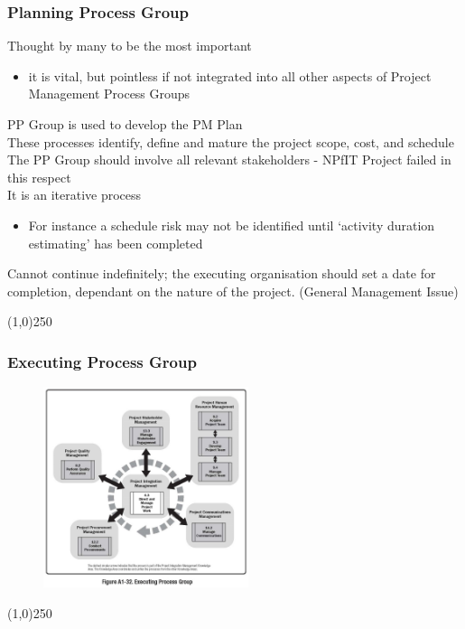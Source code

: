 \begin{frame}
\frametitle{Planning Process Group}
Thought by many to be the most important\\
\begin{itemize}
	\item it is vital, but pointless if not integrated into all other aspects of Project Management Process Groups
\end{itemize}
PP Group is used to develop the PM Plan\\
These processes identify, define and mature the project scope, cost, and schedule\\
The PP Group should involve all relevant stakeholders - NPfIT Project failed in this respect\\
It is an iterative process\\
\begin{itemize}
	\item For instance a schedule risk may not be identified until `activity duration estimating' has been completed
\end{itemize}
Cannot continue indefinitely; the executing organisation should set a date for completion, dependant on the nature of the project. (General Management Issue)\\
\end{frame}
\begin{center}\line(1,0){250}\end{center}



\begin{frame}
\frametitle{Executing Process Group}
 \begin{figure}
 	\centering
 		\includegraphics[width = 6cm]{images/FigA1-32.jpg}
 	\label{fig:A1-32}
 \end{figure}
\end{frame}
\begin{center}\line(1,0){250}\end{center}



